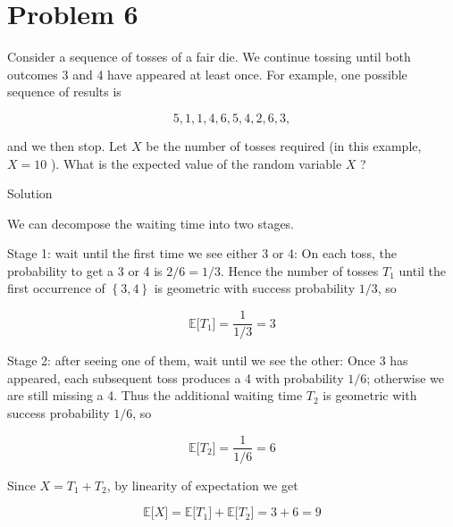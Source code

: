 \section{Problem 6}\label{hw02-problem-6}

Consider a sequence of tosses of a fair die. We continue tossing until both outcomes 3 and 4 have appeared at least once. For example, one possible sequence of results is

\[5,1,1,4,6,5,4,2,6,3,\]

and we then stop. Let \(\mathit{X}\) be the number of tosses required (in this example, \(\mathit{X} = 10\) ). What is the expected value of the random variable \(\mathit{X}\) ?

\begin{qlsolution}{Solution}

We can decompose the waiting time into two stages.

Stage 1: wait until the first time we see either 3 or 4: On each toss, the probability to get a 3 or 4 is \(2/6 = 1/3\). Hence the number of tosses \(\mathit{T}_{1}\) until the first occurrence of \(\left\{ {3,4} \right\}\) is geometric with success probability \(1/3\), so

\[\mathbb{E}\lbrack\mathit{T}_{1}\rbrack = \frac{1}{1/3} = 3\]

Stage 2: after seeing one of them, wait until we see the other: Once 3 has appeared, each subsequent toss produces a 4 with probability \(1/6\); otherwise we are still missing a 4. Thus the additional waiting time \(\mathit{T}_{2}\) is geometric with success probability \(1/6\), so

\[\mathbb{E}\lbrack\mathit{T}_{2}\rbrack = \frac{1}{1/6} = 6\]

Since \(\mathit{X} = \mathit{T}_{1} + \mathit{T}_{2}\), by linearity of expectation we get

\[\mathbb{E}\lbrack\mathit{X}\rbrack = \mathbb{E}\lbrack\mathit{T}_{1}\rbrack + \mathbb{E}\lbrack\mathit{T}_{2}\rbrack = 3 + 6 = 9\]

\end{qlsolution}

